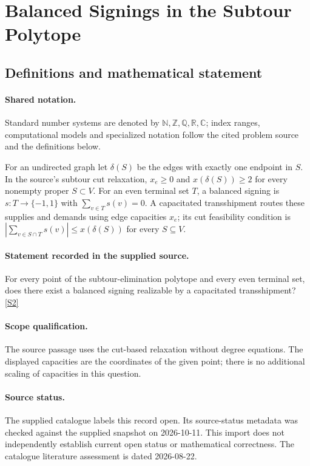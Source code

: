 \documentclass[11pt]{article}
\newcommand{\sref}[2]{\hyperlink{source:#1:#2}{[S#2]}}
\begin{document}
\section{Balanced Signings in the Subtour Polytope}\label{statement}

\subsection{Definitions and mathematical statement}

\paragraph{Shared notation.}Standard number systems are denoted by $\mathbb N,\mathbb Z,\mathbb Q,\mathbb R,\mathbb C$; index ranges, computational models and specialized notation follow the cited problem source and the definitions below.


For an undirected graph let $\delta(S)$ be the edges with exactly one endpoint in $S$. In the source's subtour cut relaxation, $x_e\geq0$ and $x(\delta(S))\geq2$ for every nonempty proper $S\subset V$. For an even terminal set $T$, a balanced signing is $s:T\to\{-1,1\}$ with $\sum_{v\in T}s(v)=0$. A capacitated transshipment routes these supplies and demands using edge capacities $x_e$; its cut feasibility condition is $|\sum_{v\in S\cap T}s(v)|\leq x(\delta(S))$ for every $S\subseteq V$.
\paragraph{Statement recorded in the supplied source.}
For every point of the subtour-elimination polytope and every even terminal set, does there exist a balanced signing realizable by a capacitated transshipment? \sref{statement}{2}
\paragraph{Scope qualification.}
The source passage uses the cut-based relaxation without degree equations. The displayed capacities are the coordinates of the given point; there is no additional scaling of capacities in this question.
\paragraph{Source status.}
The supplied catalogue labels this record open. Its source-status metadata was checked against the supplied snapshot on 2026-10-11. This import does not independently establish current open status or mathematical correctness. The catalogue literature assessment is dated 2026-08-22.
\end{document}
